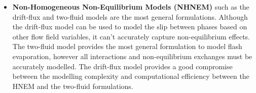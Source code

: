 \begin{itemize}
  solve a rate equation along with a homogeneous equilibrium model - the rate equation, based on empirical relaxation times, 'relaxes' the non-equilibrium mixture to the 
  equilibrium state.
  \item \textbf{Non-Homogeneous Non-Equilibrium Models (NHNEM)} such as the drift-flux and two-fluid models are the most general formulations. Although the drift-flux model can
  be used to model the slip between phases based on other flow field variables, it can't accurately capture non-equilibrium effects. The two-fluid model provides the most 
  general formulation to model flash evaporation, however all interactions and non-equilibrium exchanges must be accurately modelled. The drift-flux model provides a good compromise between
  the modelling complexity and computational efficiency between the HNEM and the two-fluid formulations.
\end{itemize}

